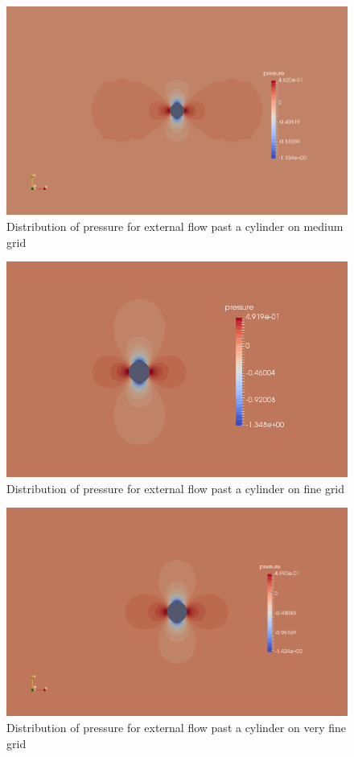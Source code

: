 \documentclass[12pt]{elsarticle}
\begin{document}
	\begin{figure}[h] \label{cyl__pres_med}
		\centering\includegraphics[width=1.0\linewidth]{pre_med}
		\caption{Distribution of pressure for external flow past a cylinder on medium grid}
	\end{figure}
	
	\begin{figure}[h] \label{cyl__pres_fin}
		\centering\includegraphics[width=1.0\linewidth]{pre_fin}
		\caption{Distribution of pressure for external flow past a cylinder on fine grid}
	\end{figure}
	\clearpage
	
	\begin{figure}[h] \label{cyl__pres_vfin}
		\centering\includegraphics[width=1.0\linewidth]{pre_vfin}
		\caption{Distribution of pressure for external flow past a cylinder on very fine grid}
	\end{figure}
	
\end{document}
